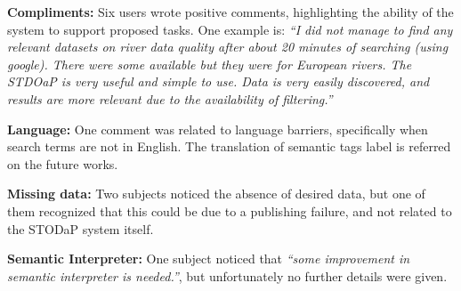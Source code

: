 \noindent \textbf{Compliments: } Six users wrote positive comments, highlighting the ability of the system to support proposed tasks. One example is: \emph{``I did not manage to find any relevant datasets on river data quality after about 20 minutes of searching (using google). There were some available but they were for European rivers. The STDOaP is very useful and simple to use. Data is very easily discovered, and results are more relevant due to the availability of filtering.''}

\noindent \textbf{Language: } One comment was related to language barriers, specifically when search terms are not in English.
The translation of semantic tags label is referred on the future works.

\noindent \textbf{Missing data: } Two subjects noticed the absence of desired data, but one of them recognized that this could be due to a publishing failure, and not related to the STODaP system itself.

\noindent \textbf{Semantic Interpreter:} One subject noticed that \emph{``some improvement in semantic interpreter is needed.''}, but unfortunately no further details were given.




